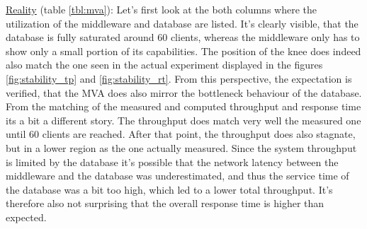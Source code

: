 \documentclass[11pt]{article}
\begin{document}
\underline{Reality} (table \ref{tbl:mva}): Let's first look at the both columns where the utilization of the middleware and database are listed. It's clearly visible, that the database is fully saturated around 60 clients, whereas the middleware only has to show only a small portion of its capabilities. The position of the knee does indeed also match the one seen in the actual experiment displayed in the figures \ref{fig:stability_tp} and \ref{fig:stability_rt}. From this perspective, the expectation is verified, that the MVA does also mirror the bottleneck behaviour of the database. From the matching of the measured and computed throughput and response time its a bit a different story. The throughput does match very well the measured one until 60 clients are reached. After that point, the throughput does also stagnate, but in a lower region as the one actually measured. Since the system throughput is limited by the database it's possible that the network latency between the middleware and the database was underestimated, and thus the service time of the database was a bit too high, which led to a lower total throughput. It's therefore also not surprising that the overall response time is higher than expected.
\end{document}
